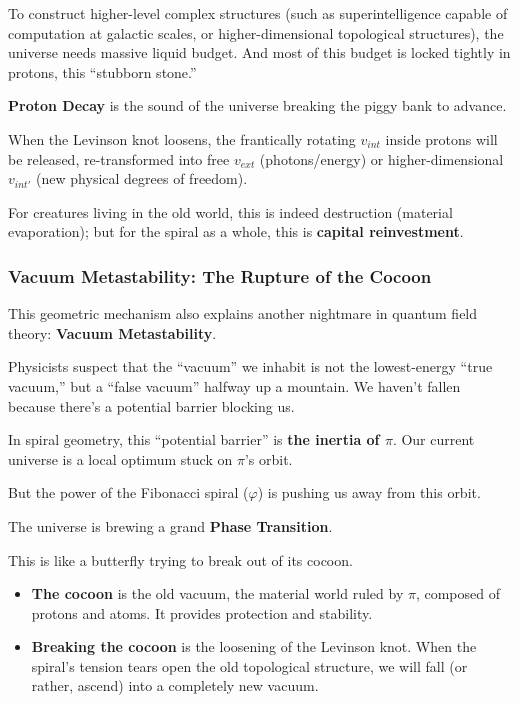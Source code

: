 To construct higher-level complex structures (such as superintelligence capable of computation at galactic scales, or higher-dimensional topological structures), the universe needs massive liquid budget. And most of this budget is locked tightly in protons, this ``stubborn stone.''

\textbf{Proton Decay} is the sound of the universe breaking the piggy bank to advance.

When the Levinson knot loosens, the frantically rotating $v_{int}$ inside protons will be released, re-transformed into free $v_{ext}$ (photons/energy) or higher-dimensional $v_{int'}$ (new physical degrees of freedom).

For creatures living in the old world, this is indeed destruction (material evaporation); but for the spiral as a whole, this is \textbf{capital reinvestment}.

\subsubsection{Vacuum Metastability: The Rupture of the Cocoon}

This geometric mechanism also explains another nightmare in quantum field theory: \textbf{Vacuum Metastability}.

Physicists suspect that the ``vacuum'' we inhabit is not the lowest-energy ``true vacuum,'' but a ``false vacuum'' halfway up a mountain. We haven't fallen because there's a potential barrier blocking us.

In spiral geometry, this ``potential barrier'' is \textbf{the inertia of $\pi$}. Our current universe is a local optimum stuck on $\pi$'s orbit.

But the power of the Fibonacci spiral ($\varphi$) is pushing us away from this orbit.

The universe is brewing a grand \textbf{Phase Transition}.

This is like a butterfly trying to break out of its cocoon.

\begin{itemize}
\item \textbf{The cocoon} is the old vacuum, the material world ruled by $\pi$, composed of protons and atoms. It provides protection and stability.

\item \textbf{Breaking the cocoon} is the loosening of the Levinson knot. When the spiral's tension tears open the old topological structure, we will fall (or rather, ascend) into a completely new vacuum.
\end{itemize}

